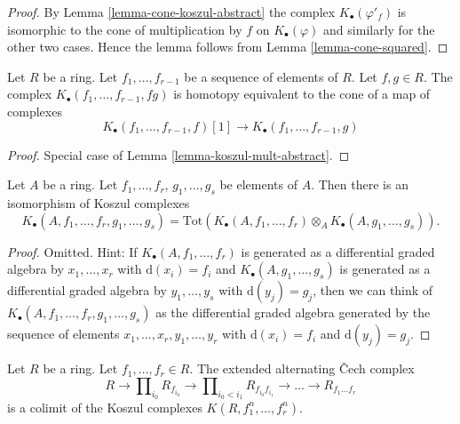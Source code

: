 \begin{proof}
By
Lemma \ref{lemma-cone-koszul-abstract}
the complex $K_\bullet(\varphi'_f)$ is isomorphic to the cone of
multiplication by $f$ on $K_\bullet(\varphi)$ and similarly
for the other two cases. Hence the lemma follows from
Lemma \ref{lemma-cone-squared}.
\end{proof}

\begin{lemma}
\label{lemma-koszul-mult}
Let $R$ be a ring. Let $f_1, \ldots, f_{r - 1}$ be a sequence of elements
of $R$. Let $f, g \in R$. The complex
$K_\bullet(f_1, \ldots, f_{r - 1}, fg)$
is homotopy equivalent to the cone of a map of complexes
$$
K_\bullet(f_1, \ldots, f_{r - 1}, f)[1]
\longrightarrow
K_\bullet(f_1, \ldots, f_{r - 1}, g)
$$
\end{lemma}

\begin{proof}
Special case of
Lemma \ref{lemma-koszul-mult-abstract}.
\end{proof}

\begin{lemma}
\label{lemma-join-sequences-koszul-complex}
Let $A$ be a ring.
Let $f_1, \ldots, f_r$, $g_1, \ldots, g_s$ be elements of $A$.
Then there is an isomorphism of Koszul complexes
$$
K_\bullet(A, f_1, \ldots, f_r, g_1, \ldots, g_s) =
\text{Tot}(K_\bullet(A, f_1, \ldots, f_r) \otimes_A
K_\bullet(A, g_1, \ldots, g_s)).
$$
\end{lemma}

\begin{proof}
Omitted. Hint: If $K_\bullet(A, f_1, \ldots, f_r)$ is generated as a
differential graded algebra by $x_1, \ldots, x_r$ with $\text{d}(x_i) = f_i$
and $K_\bullet(A, g_1, \ldots, g_s)$ is generated as a
differential graded algebra by $y_1, \ldots, y_s$ with $\text{d}(y_j) = g_j$,
then we can think of $K_\bullet(A, f_1, \ldots, f_r, g_1, \ldots, g_s)$
as the differential graded algebra generated by the sequence of elements
$x_1, \ldots, x_r, y_1, \ldots, y_r$ with $\text{d}(x_i) = f_i$
and $\text{d}(y_j) = g_j$.
\end{proof}

\begin{lemma}
\label{lemma-extended-alternating-Cech-is-colimit-koszul}
Let $R$ be a ring. Let $f_1, \ldots, f_r \in R$.
The extended alternating {\v C}ech complex
$$
R \to \prod\nolimits_{i_0} R_{f_{i_0}} \to
\prod\nolimits_{i_0 < i_1} R_{f_{i_0}f_{i_1}} \to
\ldots \to R_{f_1\ldots f_r}
$$
is a colimit of the Koszul complexes $K(R, f_1^n, \ldots, f_r^n)$.
\end{lemma}

